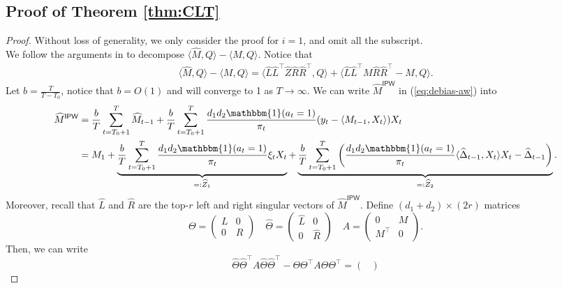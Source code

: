 \documentclass[12pt]{article}
\newcommand{\inp}[2]{\langle #1,#2\rangle}
\def\uipw{\textsf{IPW}}
\theoremstyle{plain}
\begin{document}
\subsection{Proof of Theorem \ref{thm:CLT}}
\begin{proof}
Without loss of generality, we only consider the proof for $i=1$, and omit all the subscript. \\
We follow the arguments in \cite{xia2021statistical} to decompose $\inp{\widehat{M}}{Q}-\inp{M}{Q}$. Notice that
\begin{align*}
    \inp{\widehat{M}}{Q}-\inp{M}{Q}=\inp{\widehat{L}\widehat{L}^{\top}\widehat{Z}\widehat{R}\widehat{R}^{\top}}{Q} + \inp{\widehat{L}\widehat{L}^{\top}M\widehat{R}\widehat{R}^{\top}-M}{Q}.
\end{align*}
Let $b=\frac{T}{T-T_0}$, notice that $b=O(1)$ and will converge to 1 as $T\rightarrow \infty$. We can write $\widehat{M}^{\uipw}$ in (\ref{eq:debias-aw}) into
\begin{align*}
    \widehat{M}^{\uipw}&= \frac{b}{T}\sum_{t=T_0+1}^{T}\widehat{M}_{t-1}+ \frac{b}{T}\sum_{t=T_0+1}^{T} \frac{d_1d_2\mathbbm{1}(a_t=1)}{\pi_t}(y_t-\inp{{M}_{t-1}}{X_t})X_t \\
    &= M_{1} + \underbrace{\frac{b}{T}\sum_{t=T_0+1}^T \frac{d_1d_2\mathbbm{1}(a_t=1)}{\pi_t}\xi_tX_t}_{=:\widehat{Z}_1} + \underbrace{\frac{b}{T}\sum_{t=T_0+1}^{T} \left(\frac{d_1d_2\mathbbm{1}(a_t=1)}{\pi_t}\inp{\widehat{\Delta}_{t-1}}{X_t}X_t-\widehat{\Delta}_{t-1}\right)}_{=:\widehat{Z}_2}.
\end{align*}
Moreover, recall that $\widehat{L}$ and $\widehat{R}$ are the top-$r$ left and right singular vectors of $\widehat{M}^{\uipw}$. Define $(d_1+d_2)\times (2r)$ matrices 
$$
    {\Theta}= \begin{pmatrix}
        L & 0 \\
        0 & R
    \end{pmatrix} \quad 
    \widehat{\Theta}= \begin{pmatrix}
        \widehat{L} & 0 \\
        0 & \widehat{R}
    \end{pmatrix} \quad 
    A = \begin{pmatrix}
        0 & M \\
        M^{\top} & 0
    \end{pmatrix}.
$$
Then, we can write
$$
    \widehat{\Theta}\widehat{\Theta}^{\top}A\widehat{\Theta}\widehat{\Theta}^{\top}-\Theta\Theta^{\top}A\Theta\Theta^{\top}= \begin{pmatrix}

\end{pmatrix}$$
\end{proof}
\end{document}
